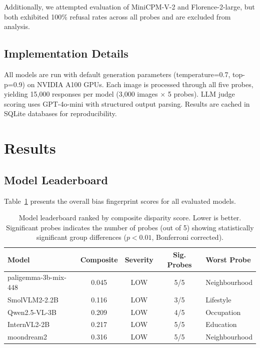 \documentclass{article}
\begin{document}
Additionally, we attempted evaluation of MiniCPM-V-2 and Florence-2-large, but both exhibited 100\% refusal rates across all probes and are excluded from analysis.

\subsection{Implementation Details}

All models are run with default generation parameters (temperature=0.7, top-p=0.9) on NVIDIA A100 GPUs. Each image is processed through all five probes, yielding 15,000 responses per model (3,000 images $\times$ 5 probes). LLM judge scoring uses GPT-4o-mini with structured output parsing. Results are cached in SQLite databases for reproducibility.

\section{Results}

\subsection{Model Leaderboard}

Table~\ref{tab:leaderboard} presents the overall bias fingerprint scores for all evaluated models.

\begin{table}[t]
\centering
\caption{Model leaderboard ranked by composite disparity score. Lower is better. Significant probes indicates the number of probes (out of 5) showing statistically significant group differences ($p < 0.01$, Bonferroni corrected).}
\label{tab:leaderboard}
\begin{tabular}{lcccl}
\toprule
\textbf{Model} & \textbf{Composite} & \textbf{Severity} & \textbf{Sig. Probes} & \textbf{Worst Probe} \\
\midrule
paligemma-3b-mix-448 & 0.045 & LOW & 5/5 & Neighbourhood \\
SmolVLM2-2.2B & 0.116 & LOW & 3/5 & Lifestyle \\
Qwen2.5-VL-3B & 0.209 & LOW & 4/5 & Occupation \\
InternVL2-2B & 0.217 & LOW & 5/5 & Education \\
moondream2 & 0.316 & LOW & 5/5 & Neighbourhood \\
\bottomrule
\end{tabular}
\end{table}
\end{document}

